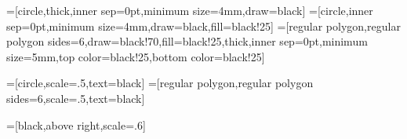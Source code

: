 

=[circle,thick,inner sep=0pt,minimum size=4mm,draw=black]
=[circle,inner sep=0pt,minimum size=4mm,draw=black,fill=black!25]
=[regular polygon,regular polygon sides=6,draw=black!70,fill=black!25,thick,inner sep=0pt,minimum size=5mm,top color=black!25,bottom color=black!25]

=[circle,scale=.5,text=black]
=[regular polygon,regular polygon sides=6,scale=.5,text=black]

=[black,above right,scale=.6]
